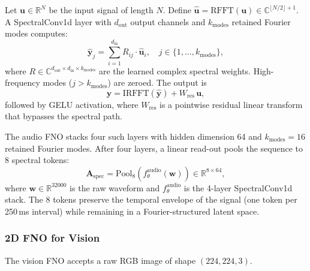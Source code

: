\begin{definition}[SpectralConv1d]
Let $\mathbf{u} \in \mathbb{R}^{N}$ be the input signal of length $N$.
Define $\hat{\mathbf{u}} = \mathrm{RFFT}(\mathbf{u}) \in \mathbb{C}^{\lfloor N/2 \rfloor + 1}$.
A SpectralConv1d layer with $d_{\mathrm{out}}$ output channels and $k_{\mathrm{modes}}$
retained Fourier modes computes:
\begin{equation}
\hat{\mathbf{y}}_{j} = \sum_{i=1}^{d_{\mathrm{in}}} R_{ij} \cdot \hat{\mathbf{u}}_i,
\quad j \in \{1, \ldots, k_{\mathrm{modes}}\},
\label{eq:spectralconv1d}
\end{equation}
where $R \in \mathbb{C}^{d_{\mathrm{out}} \times d_{\mathrm{in}} \times k_{\mathrm{modes}}}$
are the learned complex spectral weights.
High-frequency modes ($j > k_{\mathrm{modes}}$) are zeroed.
The output is
\begin{equation}
\mathbf{y} = \mathrm{IRFFT}(\hat{\mathbf{y}}) + W_{\mathrm{res}} \, \mathbf{u},
\label{eq:spectralconv1d_out}
\end{equation}
followed by GELU activation, where $W_{\mathrm{res}}$ is a pointwise residual linear
transform that bypasses the spectral path.
\end{definition}

The audio FNO stacks four such layers with hidden dimension 64 and
$k_{\mathrm{modes}} = 16$ retained Fourier modes.
After four layers, a linear read-out pools the sequence to 8 spectral tokens:
\begin{equation}
\mathbf{A}_{\mathrm{spec}} = \mathrm{Pool}_{8}\!\left(
    f_{\theta}^{\mathrm{audio}}\!\left(\mathbf{w}\right)
\right) \in \mathbb{R}^{8 \times 64},
\label{eq:audio_fno_out}
\end{equation}
where $\mathbf{w} \in \mathbb{R}^{32000}$ is the raw waveform and
$f_{\theta}^{\mathrm{audio}}$ is the 4-layer SpectralConv1d stack.
The 8 tokens preserve the temporal envelope of the signal (one token per 250\,ms
interval) while remaining in a Fourier-structured latent space.

\subsubsection{2D FNO for Vision}
\label{sec:fno_vision}

The vision FNO accepts a raw RGB image of shape $(224, 224, 3)$.

